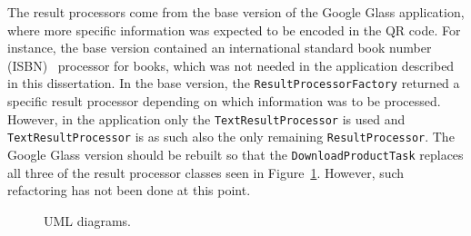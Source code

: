 The result processors come from the base version of the Google Glass application, where more specific information was expected to be encoded in the QR code. For instance, the base version contained an international standard book number (ISBN)~\cite{ISBN} processor for books, which was not needed in the application described in this dissertation. In the base version, the \texttt{ResultProcessorFactory} returned a specific result processor depending on which information was to be processed. However, in the application only the \texttt{TextResultProcessor} is used and \texttt{TextResultProcessor} is as such also the only remaining \texttt{ResultProcessor}. The Google Glass version should be rebuilt so that the \texttt{DownloadProductTask} replaces all three of the result processor classes seen in Figure~\ref{umlDiagrams}. However, such refactoring has not been done at this point. 


	\begin{figure}[ht!]
		\centering
   		 \qquad
   		 \qquad
		\caption{UML diagrams.}
		\label{umlDiagrams}
	\end{figure}
	
